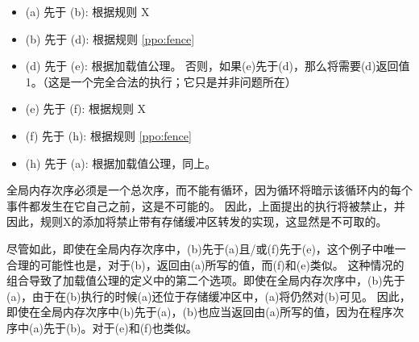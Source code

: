 \begin{itemize}
  \item (a) 先于 (b): 根据规则 X
  \item (b) 先于 (d): 根据规则 \ref{ppo:fence}
  \item (d) 先于 (e): 根据加载值公理。  否则，如果(e)先于(d)，那么将需要(d)返回值1。（这是一个完全合法的执行；它只是并非问题所在）%
  \item (e) 先于 (f): 根据规则 X
  \item (f) 先于 (h): 根据规则 \ref{ppo:fence}
  \item (h) 先于 (a): 根据加载值公理，同上。
\end{itemize}
全局内存次序必须是一个总次序，而不能有循环，因为循环将暗示该循环内的每个事件都发生在它自己之前，这是不可能的。
因此，上面提出的执行将被禁止，并因此，规则X的添加将禁止带有存储缓冲区转发的实现，这显然是不可取的。

尽管如此，即使在全局内存次序中，(b)先于(a)且/或(f)先于(e)，这个例子中唯一合理的可能性也是，对于(b)，返回由(a)所写的值，而(f)和(e)类似。
这种情况的组合导致了加载值公理的定义中的第二个选项。即使在全局内存次序中，(b)先于(a)，由于在(b)执行的时候(a)还位于存储缓冲区中，(a)将仍然对(b)可见。
因此，即使在全局内存次序中(b)先于(a)，(b)也应当返回由(a)所写的值，因为在程序次序中(a)先于(b)。对于(e)和(f)也类似。


